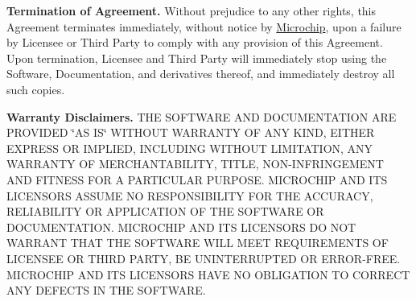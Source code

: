 \begin{DoxyEnumerate}
\item {\bfseries Termination of Agreement.} Without prejudice to any other rights, this Agreement terminates immediately, without notice by \hyperlink{namespace_microchip}{Microchip}, upon a failure by Licensee or Third Party to comply with any provision of this Agreement. Upon termination, Licensee and Third Party will immediately stop using the Software, Documentation, and derivatives thereof, and immediately destroy all such copies.


\item {\bfseries Warranty Disclaimers.} T\+H\+E S\+O\+F\+T\+W\+A\+R\+E A\+N\+D D\+O\+C\+U\+M\+E\+N\+T\+A\+T\+I\+O\+N A\+R\+E P\+R\+O\+V\+I\+D\+E\+D \char`\"{}\+A\+S I\+S\char`\"{} W\+I\+T\+H\+O\+U\+T W\+A\+R\+R\+A\+N\+T\+Y O\+F A\+N\+Y K\+I\+N\+D, E\+I\+T\+H\+E\+R E\+X\+P\+R\+E\+S\+S O\+R I\+M\+P\+L\+I\+E\+D, I\+N\+C\+L\+U\+D\+I\+N\+G W\+I\+T\+H\+O\+U\+T L\+I\+M\+I\+T\+A\+T\+I\+O\+N, A\+N\+Y W\+A\+R\+R\+A\+N\+T\+Y O\+F M\+E\+R\+C\+H\+A\+N\+T\+A\+B\+I\+L\+I\+T\+Y, T\+I\+T\+L\+E, N\+O\+N-\/\+I\+N\+F\+R\+I\+N\+G\+E\+M\+E\+N\+T A\+N\+D F\+I\+T\+N\+E\+S\+S F\+O\+R A P\+A\+R\+T\+I\+C\+U\+L\+A\+R P\+U\+R\+P\+O\+S\+E. M\+I\+C\+R\+O\+C\+H\+I\+P A\+N\+D I\+T\+S L\+I\+C\+E\+N\+S\+O\+R\+S A\+S\+S\+U\+M\+E N\+O R\+E\+S\+P\+O\+N\+S\+I\+B\+I\+L\+I\+T\+Y F\+O\+R T\+H\+E A\+C\+C\+U\+R\+A\+C\+Y, R\+E\+L\+I\+A\+B\+I\+L\+I\+T\+Y O\+R A\+P\+P\+L\+I\+C\+A\+T\+I\+O\+N O\+F T\+H\+E S\+O\+F\+T\+W\+A\+R\+E O\+R D\+O\+C\+U\+M\+E\+N\+T\+A\+T\+I\+O\+N. M\+I\+C\+R\+O\+C\+H\+I\+P A\+N\+D I\+T\+S L\+I\+C\+E\+N\+S\+O\+R\+S D\+O N\+O\+T W\+A\+R\+R\+A\+N\+T T\+H\+A\+T T\+H\+E S\+O\+F\+T\+W\+A\+R\+E W\+I\+L\+L M\+E\+E\+T R\+E\+Q\+U\+I\+R\+E\+M\+E\+N\+T\+S O\+F L\+I\+C\+E\+N\+S\+E\+E O\+R T\+H\+I\+R\+D P\+A\+R\+T\+Y, B\+E U\+N\+I\+N\+T\+E\+R\+R\+U\+P\+T\+E\+D O\+R E\+R\+R\+O\+R-\/\+F\+R\+E\+E. M\+I\+C\+R\+O\+C\+H\+I\+P A\+N\+D I\+T\+S L\+I\+C\+E\+N\+S\+O\+R\+S H\+A\+V\+E N\+O O\+B\+L\+I\+G\+A\+T\+I\+O\+N T\+O C\+O\+R\+R\+E\+C\+T A\+N\+Y D\+E\+F\+E\+C\+T\+S I\+N T\+H\+E S\+O\+F\+T\+W\+A\+R\+E.



\end{DoxyEnumerate}
